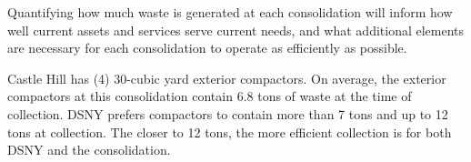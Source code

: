 
    Quantifying how much waste is generated at each consolidation will inform how well current assets and services serve current needs, and what additional elements are necessary for each consolidation to operate as efficiently as possible.
    
    Castle Hill has (4) 30-cubic yard exterior compactors. On average, the exterior compactors at this consolidation contain 6.8 tons of waste at the time of collection. DSNY prefers compactors to contain more than 7 tons and up to 12 tons at collection. The closer to 12 tons, the more efficient collection is for both DSNY and the consolidation.